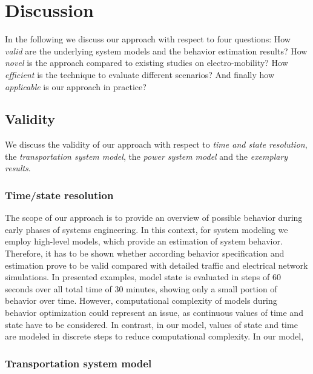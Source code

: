 \section{Discussion}
\label{section:discussion}

In the following we discuss our approach with respect to four questions: How \textit{valid} are the underlying system models and the behavior estimation results? How \textit{novel} is the approach compared to existing studies on electro-mobility? How \textit{efficient} is the technique to evaluate different scenarios? And finally how \textit{applicable} is our approach in practice?

\subsection{Validity}

We discuss the validity of our approach with respect to \textit{time and state resolution}, the \textit{transportation system model}, the \textit{power system model} and the \textit{exemplary results}.

\subsubsection{Time/state resolution}

The scope of our approach is to provide an overview of possible behavior during early phases of systems engineering. In this context, for system modeling we employ high-level models, which provide an estimation of system behavior. Therefore, it has to be shown whether according behavior specification and estimation prove to be valid compared with detailed traffic and electrical network simulations. In presented examples, model state is evaluated in steps of 60 seconds over all total time of 30 minutes, showing only a small portion of behavior over time. However, computational complexity of models during behavior optimization could represent an issue, as continuous values of time and state have to be considered. In contrast, in our model, values of state and time are modeled in discrete steps to reduce computational complexity. In our model, 

\subsubsection{Transportation system model}

